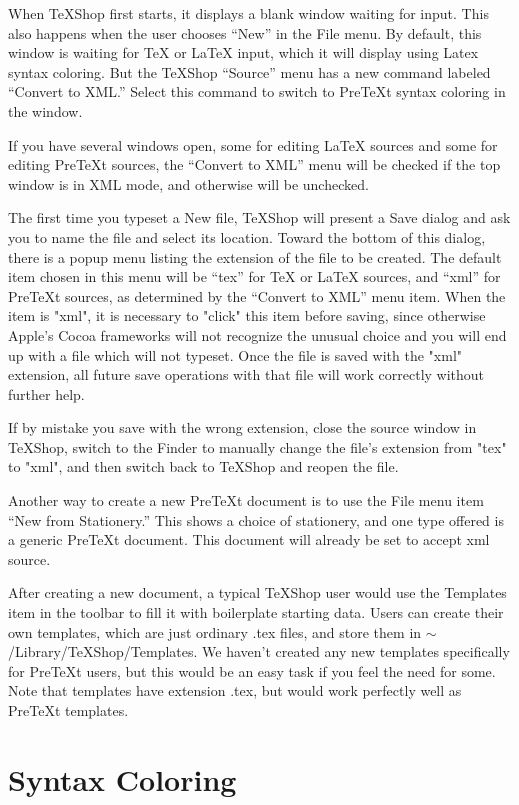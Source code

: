 \documentclass[11pt, oneside]{article}   	%
\begin{document}
When TeXShop first starts, it  displays a blank window waiting for input. This also happens when the user chooses ``New'' in the File menu. By default, this window is waiting for TeX or LaTeX input, which it will display using Latex syntax coloring. But the TeXShop ``Source'' menu has a new command labeled ``Convert to XML.'' Select this command to switch to PreTeXt syntax coloring in the window. 

If you have several windows open, some for editing LaTeX sources and some for editing PreTeXt sources, the ``Convert to XML'' menu will be checked if the top window is in XML mode, and otherwise will be unchecked.

The first time you typeset a New file, TeXShop will  present a Save dialog and ask you to name the file and select its location. Toward the bottom of this dialog, there is a popup menu listing the extension of the file to be created. The default item chosen in this menu will be ``tex'' for TeX or LaTeX sources, and ``xml'' for PreTeXt sources, as determined by the ``Convert to XML'' menu item.  When the item is "xml",  it is necessary to "click" this item before saving, since otherwise Apple's Cocoa frameworks will not recognize the unusual choice and you will end up with a file which will not typeset.  Once the file is saved  with the "xml" extension, all future save operations with that file will work correctly without further help.

If by mistake you save with the wrong extension, close the source window in TeXShop, switch to the Finder to manually change the file's extension from "tex" to "xml", and then switch back to TeXShop and reopen the file.

Another way to create a new PreTeXt document is to use the File menu item ``New from Stationery.'' This shows a choice of stationery, and one type offered is a generic PreTeXt document. This document will already be set to accept xml source.

After creating a new document, a typical TeXShop user would use the Templates item in the toolbar to fill it with boilerplate starting data. Users can create their own templates, which are just ordinary .tex files, and store them in $\sim$/Library/TeXShop/Templates. We haven't created any new templates specifically for PreTeXt users, but this would be an easy task if you feel the need for some. Note that templates have extension .tex, but would work perfectly well as PreTeXt templates.

\section{Syntax Coloring}
\end{document}
